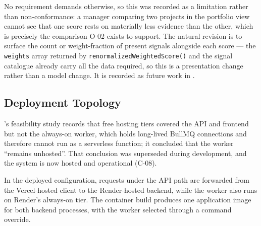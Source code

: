 No requirement demands otherwise, so this was recorded as a limitation rather
than non-conformance: a manager comparing two projects in the portfolio view
cannot see that one score rests on materially less evidence than the other,
which is precisely the comparison O-02 exists to support. The natural revision
is to surface the count or weight-fraction of present signals alongside each
score --- the \texttt{weights} array returned by
\texttt{renormalizedWeightedScore()} and the signal catalogue already carry all
the data required, so this is a presentation change rather than a model change.
It is recorded as future work in .

\subsection{Deployment Topology}
\label{subsec:deviation-deployment}

's feasibility study records that free hosting tiers covered
the API and frontend but not the always-on worker, which holds long-lived BullMQ
connections and therefore cannot run as a serverless function; it concluded that
the worker ``remains unhosted''. That conclusion was superseded during
development, and the system is now hosted and operational (C-08).

In the deployed configuration, requests under the API path are forwarded from
the Vercel-hosted client to the Render-hosted backend, while the worker also
runs on Render's always-on tier. The container build produces one application
image for both backend processes, with the worker selected through a command
override.

